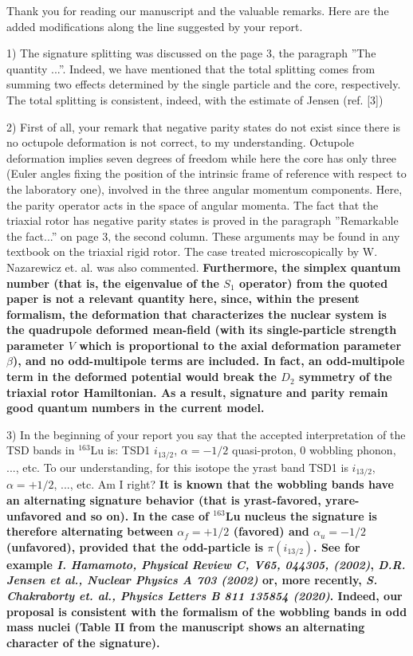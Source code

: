 \documentclass[11pt,a4paper]{article}
\begin{document}
Thank you for reading our manuscript and the valuable remarks. Here are the added modifications along the line suggested by your report.

1) The signature splitting was discussed on the page 3, the paragraph ”The quantity ...”. Indeed, we have mentioned that the total splitting comes from summing two effects determined by the single particle and the core, respectively. The total splitting is consistent, indeed, with the estimate of Jensen (ref. [3])

2) First of all, your remark that negative parity states do not exist since there is no octupole deformation is not correct, to my understanding. Octupole deformation implies seven degrees of freedom while here the core has only three (Euler angles fixing the position of the intrinsic frame of reference with respect to the laboratory one), involved in the three angular momentum components. Here, the parity operator acts in the space of angular momenta. The fact that the triaxial rotor has negative parity states is proved in the paragraph ”Remarkable the fact...” on page 3, the second column. These arguments may be found in any textbook on the triaxial rigid rotor. The case treated microscopically by W. Nazarewicz et. al. was also commented. \textbf{Furthermore, the simplex quantum number (that is, the eigenvalue of the $S_1$ operator) from the quoted paper is not a relevant quantity here, since, within the present formalism, the deformation that characterizes the nuclear system is the quadrupole deformed mean-field (with its single-particle strength parameter $V$ which is proportional to the axial deformation parameter $\beta$), and no odd-multipole terms are included. In fact, an odd-multipole term in the deformed potential would break the $D_2$ symmetry of the triaxial rotor Hamiltonian. As a result, signature and parity remain good quantum numbers in the current model.}

3) In the beginning of your report you say that the accepted interpretation of the TSD bands in $^{163}$Lu is: TSD1 $i_{13/2}$, $\alpha = -1/2$ quasi-proton, 0 wobbling phonon, ..., etc. To our understanding, for this isotope the yrast band TSD1 is $i_{13/2}$,  $\alpha= +1/2$, ..., etc. Am I right? 
\textbf{It is known that the wobbling bands have an alternating signature behavior (that is yrast-favored, yrare-unfavored and so on). In the case of $^{163}$Lu nucleus the signature is therefore alternating between $\alpha_f=+1/2$ (favored) and $\alpha_u=-1/2$ (unfavored), provided that the odd-particle is $\pi(i_{13/2})$. See for example \emph{I. Hamamoto, Physical Review C, V65, 044305, (2002)}, \emph{D.R. Jensen et al., Nuclear Physics A 703 (2002)} or, more recently, \emph{S. Chakraborty et. al., Physics Letters B 811 135854 (2020)}. Indeed, our proposal is consistent with the formalism of the wobbling bands in odd mass nuclei (Table II from the manuscript shows an alternating character of the signature).}
\end{document}
